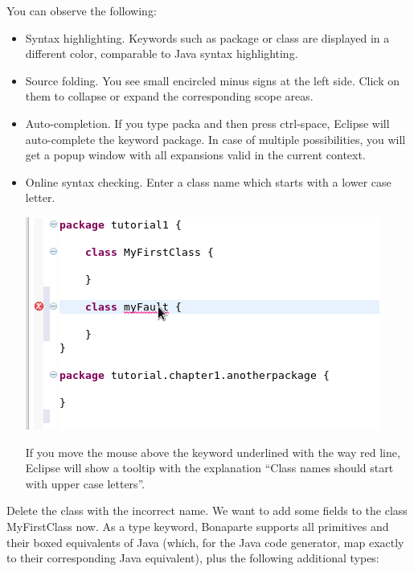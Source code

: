 \documentclass[11pt,a4paper,oneside]{article}
\begin{document}
\noindent
You can observe the following:
\begin{itemize}
  \item Syntax highlighting. Keywords such as {\ttfamily package} or {\ttfamily class} are displayed in a different color,
  comparable to Java syntax highlighting.
  \item Source folding. You see small encircled minus signs at the left side. Click on them to collapse or expand the corresponding scope areas.
  \item Auto-completion.  If you type {\ttfamily packa} and then press ctrl-space, Eclipse will auto-complete the keyword {\ttfamily package}.
  In case of multiple possibilities, you will get a popup window with all expansions valid in the current context. 
  \item Online syntax checking. Enter a class name which starts with a lower case letter.  

\vspace{2mm}

\hspace{1cm}\includegraphics[scale=0.5]{images/tut1-002.png}

    \noindent 
    If you move the mouse above the keyword underlined with the way red line, Eclipse will show a tooltip with the explanation
     ``Class names should start with upper case letters''. 
 
\end{itemize}

Delete the class with the incorrect name. We want to add some fields to the class {\ttfamily MyFirstClass} now. As a type keyword, Bonaparte supports all
primitives and their boxed equivalents of Java (which, for the Java code generator, map exactly to their corresponding Java equivalent), plus the following additional types:
 
\end{document}
